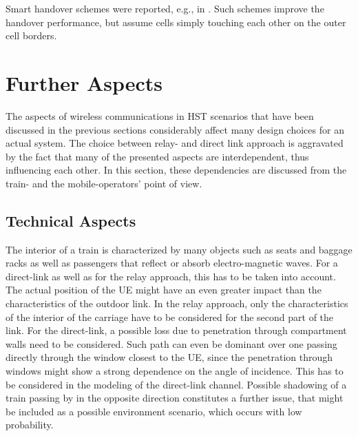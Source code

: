 \documentclass[a4paper,conference,twocolumn,10pt]{IEEEtran}
\begin{document}
Smart handover schemes were reported, e.g., in \cite{handover}. Such schemes improve the handover performance, but assume cells simply touching each other on the outer cell borders.\\



\section{Further Aspects}
\label{Sec:Further_Aspects}

The aspects of wireless communications in \ac{HST} scenarios that have been discussed in the previous sections considerably affect many design choices for an actual system. The choice between relay- and direct link approach is aggravated by the fact that many of the presented aspects are interdependent, thus influencing each other. In this section, these dependencies are discussed from the train- and the mobile-operators' point of view.\\

\subsection{Technical Aspects}
The interior of a train is characterized by many objects such as seats and baggage racks as well as passengers that reflect or absorb electro-magnetic waves. For a direct-link as well as for the relay approach, this has to be taken into account. The actual position of the \ac{UE} might have an even greater impact than the characteristics of the outdoor link. In the relay approach, only the characteristics of the interior of the carriage have to be considered for the second part of the link. For the direct-link, a possible loss due to penetration through compartment walls need to be considered. Such path can even be dominant over one passing directly through the window closest to the \ac{UE}, since the penetration through windows might show a strong dependence on the angle of incidence. This has to be considered in the modeling of the direct-link channel. Possible shadowing of a train passing by in the opposite direction constitutes a further issue, that might be included as a possible environment scenario, which occurs with low probability.
\end{document}
